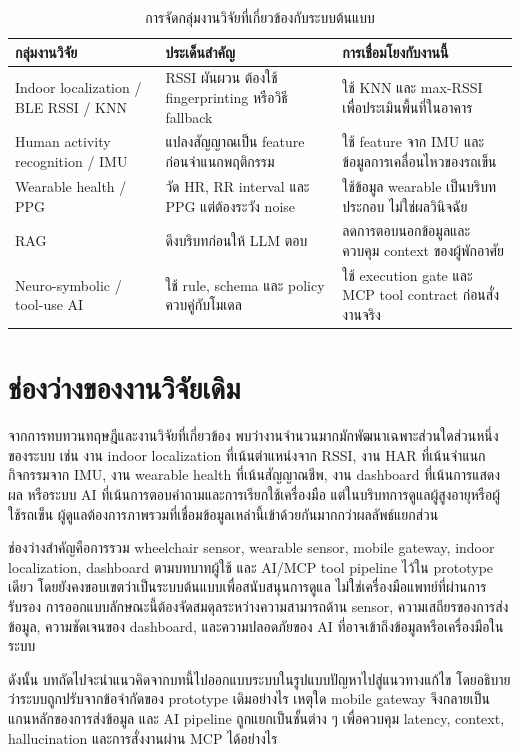\begin{table}[htbp]
    \centering
    \caption{การจัดกลุ่มงานวิจัยที่เกี่ยวข้องกับระบบต้นแบบ}
    \label{tab:ch2_related_work_groups}
    \small
    \begin{tabular}{>{\raggedright\arraybackslash}p{}
                    >{\raggedright\arraybackslash}p{}
                    >{\raggedright\arraybackslash}p{}}
        \toprule
        กลุ่มงานวิจัย & ประเด็นสำคัญ & การเชื่อมโยงกับงานนี้ \\ \midrule
        Indoor localization / BLE RSSI / KNN & RSSI ผันผวน ต้องใช้ fingerprinting หรือวิธี fallback & ใช้ KNN และ max-RSSI เพื่อประเมินพื้นที่ในอาคาร \\ \midrule
        Human activity recognition / IMU & แปลงสัญญาณเป็น feature ก่อนจำแนกพฤติกรรม & ใช้ feature จาก IMU และข้อมูลการเคลื่อนไหวของรถเข็น \\ \midrule
        Wearable health / PPG & วัด HR, RR interval และ PPG แต่ต้องระวัง noise & ใช้ข้อมูล wearable เป็นบริบทประกอบ ไม่ใช่ผลวินิจฉัย \\ \midrule
        RAG & ดึงบริบทก่อนให้ LLM ตอบ & ลดการตอบนอกข้อมูลและควบคุม context ของผู้พักอาศัย \\ \midrule
        Neuro-symbolic / tool-use AI & ใช้ rule, schema และ policy ควบคู่กับโมเดล & ใช้ execution gate และ MCP tool contract ก่อนสั่งงานจริง \\ \bottomrule
    \end{tabular}
\end{table}

\section{ช่องว่างของงานวิจัยเดิม}
\label{sec:ch2_research_gap}

จากการทบทวนทฤษฎีและงานวิจัยที่เกี่ยวข้อง พบว่างานจำนวนมากมักพัฒนาเฉพาะส่วนใดส่วนหนึ่งของระบบ เช่น งาน indoor localization ที่เน้นตำแหน่งจาก RSSI, งาน HAR ที่เน้นจำแนกกิจกรรมจาก IMU, งาน wearable health ที่เน้นสัญญาณชีพ, งาน dashboard ที่เน้นการแสดงผล หรือระบบ AI ที่เน้นการตอบคำถามและการเรียกใช้เครื่องมือ แต่ในบริบทการดูแลผู้สูงอายุหรือผู้ใช้รถเข็น ผู้ดูแลต้องการภาพรวมที่เชื่อมข้อมูลเหล่านี้เข้าด้วยกันมากกว่าผลลัพธ์แยกส่วน

ช่องว่างสำคัญคือการรวม wheelchair sensor, wearable sensor, mobile gateway, indoor localization, dashboard ตามบทบาทผู้ใช้ และ AI/MCP tool pipeline ไว้ใน prototype เดียว โดยยังคงขอบเขตว่าเป็นระบบต้นแบบเพื่อสนับสนุนการดูแล ไม่ใช่เครื่องมือแพทย์ที่ผ่านการรับรอง การออกแบบลักษณะนี้ต้องจัดสมดุลระหว่างความสามารถด้าน sensor, ความเสถียรของการส่งข้อมูล, ความชัดเจนของ dashboard, และความปลอดภัยของ AI ที่อาจเข้าถึงข้อมูลหรือเครื่องมือในระบบ

ดังนั้น บทถัดไปจะนำแนวคิดจากบทนี้ไปออกแบบระบบในรูปแบบปัญหาไปสู่แนวทางแก้ไข โดยอธิบายว่าระบบถูกปรับจากข้อจำกัดของ prototype เดิมอย่างไร เหตุใด mobile gateway จึงกลายเป็นแกนหลักของการส่งข้อมูล และ AI pipeline ถูกแยกเป็นชั้นต่าง ๆ เพื่อควบคุม latency, context, hallucination และการสั่งงานผ่าน MCP ได้อย่างไร
